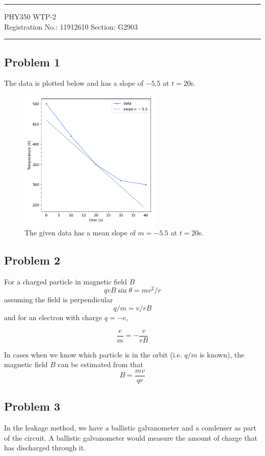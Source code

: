 \documentclass[11pt]{article}
\begin{document}
	
	\author{Aayush Arya}
	\date{(Submitted: \today)}
	\title{}
	
	\maketitle
	
	\hrule
	\begin{center}
		PHY350 WTP-2\\
	 	 \quad Registration No.: 11912610 \quad Section: G2903
	\end{center}
	\hrule
	
	\subsection*{Problem 1}
	The data is plotted below and has a slope of $-5.5$ at $t=20$s.
	\begin{figure}[h!]
		\centering
		\includegraphics[width=0.6\textwidth]{problem1}
		\caption{The given data has a mean slope of $m=-5.5$ at $t=20$s.}
	\end{figure}

	\subsection*{Problem 2}
	For a charged particle in magnetic field $B$
	\[qvB\sin\theta = mv^2/r \]
		assuming the field is perpendicular
	\[q/m = v/rB\]
	and for an electron with charge $q=-e$,

	\[
	\boxed{
		\frac{e}{m} = -
		\frac{v}{rB}
	}
	\]

	In cases when we know which particle is in the orbit (i.e. $q/m$ is known), the magnetic field $B$ can be estimated from that \[ \boxed{B = \frac{mv}{qr}} \]
	
	
	\subsection*{Problem 3}
	In the leakage method, we have a ballistic galvanometer and a condenser as part of the circuit. A ballistic galvanometer would measure the amount of charge that has discharged through it. 
	
\end{document}
